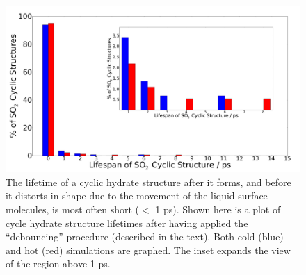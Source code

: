 \begin{figure}[h!]
	\begin{center}
		\includegraphics[scale=1.0]{images/cycles/cyclic-lifespans-inset-small.png}
		\caption{The lifetime of a cyclic hydrate structure after it forms, and before it distorts in shape due to the movement of the liquid surface molecules, is most often short ($<$ 1 ps). Shown here is a plot of cycle hydrate structure lifetimes after having applied the ``debouncing'' procedure (described in the text). Both cold (blue) and hot (red) simulations are graphed. The inset expands the view of the region above 1 ps.}
		\label{fig:cycle-lifespans}
	\end{center}
\end{figure}
